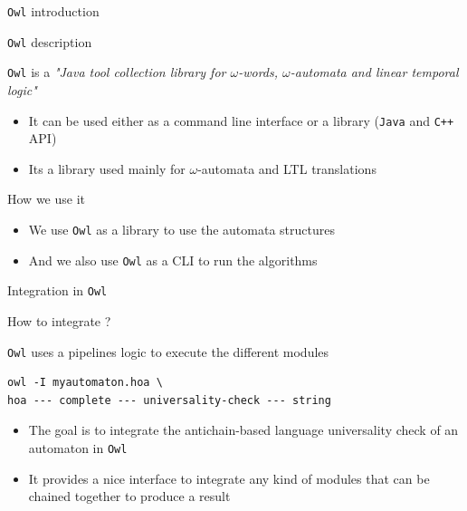 \documentclass[10pt]{beamer}
\begin{document}
\begin{frame}{\texttt{Owl} introduction}

\begin{block}{\texttt{Owl} description}

\begin{center}

\texttt{Owl} is a  \textit{"Java tool collection library for $\omega$-words, $\omega$-automata
 and linear temporal logic"}
\end{center}

\begin{itemize}
  \item It can be used either as a command line interface or a library (\texttt{Java} and \texttt{C++} API)
  \item Its a library used mainly for $\omega$-automata and LTL translations
\end{itemize}

\end{block}

\begin{block}{How we use it}

\begin{itemize}
  \item We use \texttt{Owl} as a library to use the automata structures
  \item And we also use \texttt{Owl} as a CLI to run the algorithms
\end{itemize}

\end{block}

\end{frame}

\begin{frame}[fragile]{Integration in \texttt{Owl}}

\begin{block}{How to integrate ?}
\begin{center}
\texttt{Owl} uses a pipelines logic to execute the different modules
\begin{lstlisting}
owl -I myautomaton.hoa \
hoa --- complete --- universality-check --- string
\end{lstlisting}
\end{center}
\end{block}

\begin{itemize}
  \item The goal is to integrate the antichain-based language universality check of an automaton in \texttt{Owl}
  \item It provides a nice interface to integrate any kind of modules that can be chained together to produce a result
\end{itemize}

\end{frame}
\end{document}
